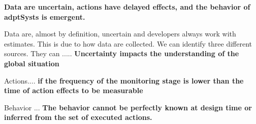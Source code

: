 \textbf{Data are uncertain, actions have delayed effects, and the behavior of \glspl{adptSyst} is emergent.}

Data are, almost by definition, uncertain and developers always work with estimates.
This is due to how data are collected.
We can identify three different sources.
They can .....
\textbf{Uncertainty impacts the understanding of the global situation}

Actions....
\textbf{if the frequency of the monitoring stage is lower than the time of action effects to be measurable}


Behavior ...
\textbf{The behavior cannot be perfectly known at design time or inferred from the set of executed actions.}
